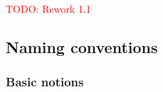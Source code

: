 




% 


\textcolor{red}{TODO: Rework 1.1}







\subsection{Naming conventions}
\label{basic}

\subsubsection{Basic notions}

